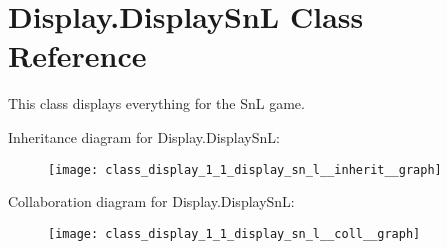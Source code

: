 \hypertarget{class_display_1_1_display_sn_l}{}\section{Display.\+Display\+Sn\+L Class Reference}
\label{class_display_1_1_display_sn_l}


This class displays everything for the Sn\+L game.  




Inheritance diagram for Display.\+Display\+Sn\+L\+:\nopagebreak
\begin{figure}[H]
\begin{center}
\leavevmode
\texttt{[image: class\_display\_1\_1\_display\_sn\_l\_\_inherit\_\_graph]}
\end{center}
\end{figure}


Collaboration diagram for Display.\+Display\+Sn\+L\+:\nopagebreak
\begin{figure}[H]
\begin{center}
\leavevmode
\texttt{[image: class\_display\_1\_1\_display\_sn\_l\_\_coll\_\_graph]}
\end{center}
\end{figure}
